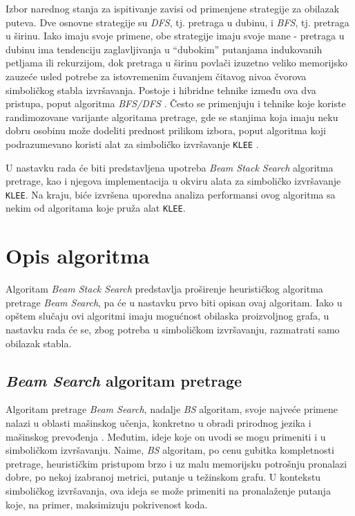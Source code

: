 \documentclass[a4paper]{article}
\begin{document}
Izbor narednog stanja za ispitivanje zavisi od primenjene strategije za obilazak puteva. Dve osnovne strategije su \textit{DFS}, tj. pretraga u dubinu, i \textit{BFS}, tj. pretraga u širinu. Iako imaju svoje primene, obe strategije imaju svoje mane - pretraga u dubinu ima tendenciju zaglavljivanja u \enquote{dubokim} putanjama indukovanih petljama ili rekurzijom, dok pretraga u širinu povlači izuzetno veliko memorijsko zauzeće usled potrebe za istovremenim čuvanjem čitavog nivoa čvorova simboličkog stabla izvršavanja. Postoje i hibridne tehnike između ova dva pristupa, poput algoritma \textit{BFS/DFS} \cite{BFS/DFS-StrahinjaStanojevic}. Često se primenjuju i tehnike koje koriste randimozovane varijante algoritama pretrage, gde se stanjima koja imaju neku dobru osobinu može dodeliti prednost prilikom izbora, poput algoritma koji podrazumevano koristi alat za simboličko izvršavanje \verb|KLEE| \cite{KLEE-paper-10.5555/1855741.1855756}.

U nastavku rada će biti predstavljena upotreba \textit{Beam Stack Search} algoritma pretrage, kao i njegova implementacija u okviru alata za simboličko izvršavanje \verb|KLEE|. Na kraju, biće izvršena uporedna analiza performansi ovog algoritma sa nekim od algoritama koje pruža alat \verb|KLEE|.

\section{Opis algoritma}

Algoritam \textit{Beam Stack Search} \cite{BeamStackSearch-10.5555/3037062.3037074} predstavlja proširenje heurističkog algoritma pretrage \textit{Beam Search}, pa će u nastavku prvo biti opisan ovaj algoritam. Iako u opštem slučaju ovi algoritmi imaju mogućnost obilaska proizvoljnog grafa, u nastavku rada će se, zbog potreba u simboličkom izvršavanju, razmatrati samo obilazak stabla.

\subsection{\textit{Beam Search} algoritam pretrage}

Algoritam pretrage \textit{Beam Search}, nadalje \textit{BS} algoritam, svoje najveće primene nalazi u oblasti mašinskog učenja, konkretno u obradi prirodnog jezika i mašinskog prevođenja \cite{HarpySpeechRecognitionSystem, BeamSearchStrategiesForNeuralMachineTranslation, BestFirstBeamSearch}. Međutim, ideje koje on uvodi se mogu primeniti i u simboličkom izvršavanju. Naime, \textit{BS} algoritam, po cenu gubitka kompletnosti pretrage, heurističkim pristupom brzo i uz malu memorijsku potrošnju pronalazi dobre, po nekoj izabranoj metrici, putanje u težinskom grafu. U kontekstu simboličkog izvršavanja, ova ideja se može primeniti na pronalaženje putanja koje, na primer, maksimizuju pokrivenost koda.
\end{document}
